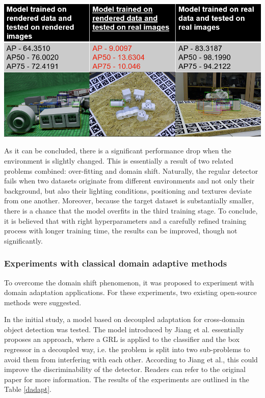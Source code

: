 \begin{table}[htb]
	\begin{center}
		\includegraphics[width=14cm]{./initialExp.png}
	\end{center}
	\begin{center}
		\label{faster_init}
	\end{center}
\end{table}
\FloatBarrier

As it can be concluded, there is a significant performance drop when the environment is slightly changed. This is essentially a result of two related problems combined: over-fitting and domain shift. Naturally, the regular detector fails when two datasets originate from different environments and not only their background, but also their lighting conditions, positioning and textures deviate from one another. Moreover, because the target dataset is substantially smaller, there is a chance that the model overfits in the third training stage. To conclude, it is believed that with right hyperparameters and a carefully refined training  process with longer training time, the results can be improved, though not significantly. 

\subsubsection{Experiments with classical domain adaptive methods}
To overcome the domain shift phenomenon, it was proposed to experiment with domain adaptation applications. For these experiments, two existing open-source methods were suggested. 

In the initial study, a model based on decoupled adaptation for cross-domain object detection \cite{Jiang2021} was tested. The model introduced by Jiang et al. essentially proposes an  approach, where a GRL is applied to the classifier and the box regressor in a decoupled way, i.e. the problem is split into two sub-problems to avoid them from interfering with each other. According to Jiang et al., this could improve the discriminability of the detector. Readers can refer to the original paper \cite{Jiang2021} for more information. The results of the experiments are outlined in the Table \ref{dadapt}.

